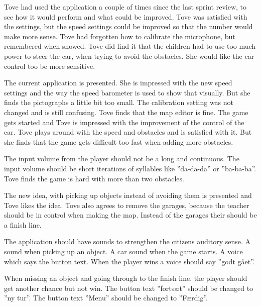 \label{interview_tove_8_5}
Tove had used the application a couple of times since the last sprint review, to see how it would perform and what could be improved.
Tove was satisfied with the settings, but the speed settings could be improved so that the number would make more sense.
Tove had forgotten how to calibrate the microphone, but remembered when showed.
Tove did find it that the children had to use too much power to steer the car, when trying to avoid the obstacles.
She would like the car control too be more sensitive.


The current application is presented.
She is impressed with the new speed settings and the way the speed barometer is used to show that visually.
But she finds the pictographs a little bit too small.
The calibration setting was not changed and is still confusing.
Tove finds that the map editor is fine.
The game gets started and Tove is impressed with the improvement of the control of the car.
Tove plays around with the speed and obstacles and is satisfied with it.
But she finds that the game gets difficult too fast when adding more obstacles.


The input volume from the player should not be a long and continuous.
The input volume should be short iterations of syllables like ''da-da-da'' or ''ba-ba-ba''.
Tove finds the game is hard with more than two obstacles.


The new idea, with picking up objects instead of avoiding them is presented and Tove likes the idea.
Tove also agrees to remove the garages, because the teacher should be in control when making the map.
Instead of the garages their should be a finish line.


The application should have sounds to strengthen the citizens auditory sense.
A sound when picking up an object.
A car sound when the game starts.
A voice which says the button text.
When the player wins a voice should say ''godt gået''.

When missing an object and going through to the finish line, the player should get another chance but not win.
The button text ''fortsæt'' should be changed to ''ny tur''.
The button text ''Menu'' should be changed to ''Færdig''.